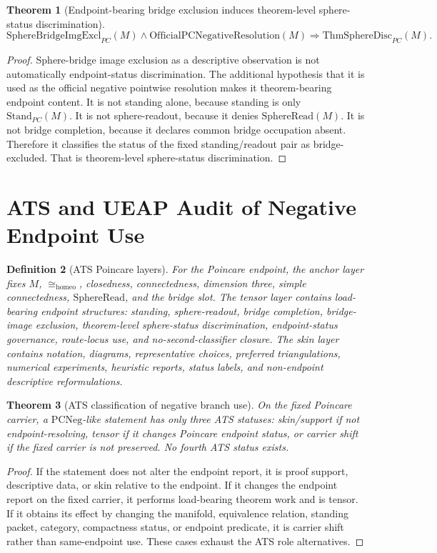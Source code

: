 \documentclass[11pt]{article}
\newtheorem{theorem}{Theorem}[section]
\newtheorem{definition}[theorem]{Definition}
\newcommand{\StandPC}{\mathrm{Stand}_{PC}}
\newcommand{\SphereRead}{\mathrm{SphereRead}}
\newcommand{\OfficialPCNegativeResolution}{\mathrm{OfficialPCNegativeResolution}}
\newcommand{\PCNeg}{\mathrm{PCNeg}}
\newcommand{\SphereBridgeImgExcl}{\mathrm{SphereBridgeImgExcl}_{PC}}
\newcommand{\ThmSphereDisc}{\mathrm{ThmSphereDisc}_{PC}}
\newcommand{\Homeo}{\cong_{\mathrm{homeo}}}
\begin{document}
\begin{theorem}[Endpoint-bearing bridge exclusion induces theorem-level sphere-status discrimination]\label{thm:bridge-excl-disc}
\[
\SphereBridgeImgExcl(M)\wedge\OfficialPCNegativeResolution(M)\Rightarrow \ThmSphereDisc(M).
\]
\end{theorem}
\begin{proof}
Sphere-bridge image exclusion as a descriptive observation is not automatically endpoint-status discrimination. The additional hypothesis that it is used as the official negative pointwise resolution makes it theorem-bearing endpoint content. It is not standing alone, because standing is only \(\StandPC(M)\). It is not sphere-readout, because it denies \(\SphereRead(M)\). It is not bridge completion, because it declares common bridge occupation absent. Therefore it classifies the status of the fixed standing/readout pair as bridge-excluded. That is theorem-level sphere-status discrimination.
\end{proof}

\section{ATS and UEAP Audit of Negative Endpoint Use}\label{sec:ats-ueap-negative}

\begin{definition}[ATS Poincare layers]
For the Poincare endpoint, the anchor layer fixes \(M\), \(\Homeo\), closedness, connectedness, dimension three, simple connectedness, \(\SphereRead\), and the bridge slot. The tensor layer contains load-bearing endpoint structures: standing, sphere-readout, bridge completion, bridge-image exclusion, theorem-level sphere-status discrimination, endpoint-status governance, route-locus use, and no-second-classifier closure. The skin layer contains notation, diagrams, representative choices, preferred triangulations, numerical experiments, heuristic reports, status labels, and non-endpoint descriptive reformulations.
\end{definition}

\begin{theorem}[ATS classification of negative branch use]\label{thm:ats-negative-classification}
On the fixed Poincare carrier, a \(\PCNeg\)-like statement has only three ATS statuses: skin/support if not endpoint-resolving, tensor if it changes Poincare endpoint status, or carrier shift if the fixed carrier is not preserved. No fourth ATS status exists.
\end{theorem}
\begin{proof}
If the statement does not alter the endpoint report, it is proof support, descriptive data, or skin relative to the endpoint. If it changes the endpoint report on the fixed carrier, it performs load-bearing theorem work and is tensor. If it obtains its effect by changing the manifold, equivalence relation, standing packet, category, compactness status, or endpoint predicate, it is carrier shift rather than same-endpoint use. These cases exhaust the ATS role alternatives.
\end{proof}
\end{document}
